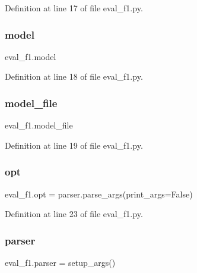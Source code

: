 Definition at line 17 of file eval\+\_\+f1.\+py.

\mbox{\label{namespaceeval__f1_a642d651c51ad9549b2fa7c09cbb15c6a}} 
\subsubsection{\texorpdfstring{model}{model}}
{\footnotesize\ttfamily eval\+\_\+f1.\+model}



Definition at line 18 of file eval\+\_\+f1.\+py.

\mbox{\label{namespaceeval__f1_a293cb9102016cf4d791145b46c7c0986}} 
\subsubsection{\texorpdfstring{model\+\_\+file}{model\_file}}
{\footnotesize\ttfamily eval\+\_\+f1.\+model\+\_\+file}



Definition at line 19 of file eval\+\_\+f1.\+py.

\mbox{\label{namespaceeval__f1_a35e7e28dce87506eff4c9190e26627cb}} 
\subsubsection{\texorpdfstring{opt}{opt}}
{\footnotesize\ttfamily eval\+\_\+f1.\+opt = parser.\+parse\+\_\+args(print\+\_\+args=False)}



Definition at line 23 of file eval\+\_\+f1.\+py.

\mbox{\label{namespaceeval__f1_ab2fe9dff5b10a93f59eb1f52eccee74c}} 
\subsubsection{\texorpdfstring{parser}{parser}}
{\footnotesize\ttfamily eval\+\_\+f1.\+parser = setup\+\_\+args()}



